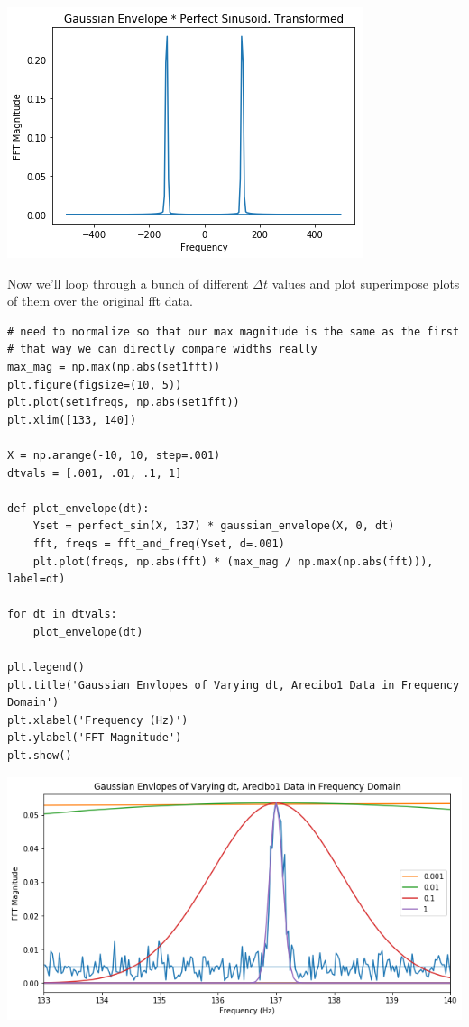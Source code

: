 \documentclass[11pt]{article}
\begin{document}
\includegraphics[width=.9\linewidth]{./obipy-resources/3333ef.png}

Now we'll loop through a bunch of different $\Delta t$ values and plot
superimpose plots of them over the original fft data.

\begin{verbatim}
# need to normalize so that our max magnitude is the same as the first
# that way we can directly compare widths really
max_mag = np.max(np.abs(set1fft))
plt.figure(figsize=(10, 5))
plt.plot(set1freqs, np.abs(set1fft))
plt.xlim([133, 140])

X = np.arange(-10, 10, step=.001)
dtvals = [.001, .01, .1, 1]

def plot_envelope(dt):
    Yset = perfect_sin(X, 137) * gaussian_envelope(X, 0, dt)
    fft, freqs = fft_and_freq(Yset, d=.001)
    plt.plot(freqs, np.abs(fft) * (max_mag / np.max(np.abs(fft))), label=dt)

for dt in dtvals:
    plot_envelope(dt)

plt.legend()
plt.title('Gaussian Envlopes of Varying dt, Arecibo1 Data in Frequency Domain') 
plt.xlabel('Frequency (Hz)')
plt.ylabel('FFT Magnitude')
plt.show()
\end{verbatim}

\includegraphics[width=.9\linewidth]{./obipy-resources/333Epl.png}
\end{document}
